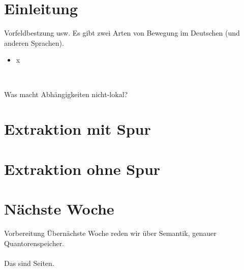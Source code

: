 \section{Einleitung}

\begin{frame}
  {Vorfeldbestzung usw.}
  \onslide<+->
  \onslide<+->
  Es gibt zwei Arten von Bewegung im Deutschen (und anderen Sprachen).\\
  \Zeile
  \begin{itemize}[<+->]
    \item x
  \end{itemize}
  \Zeile
  \onslide<+->
  \centering 
  \\
\end{frame}

\begin{frame}
  {Was macht Abhängigkeiten nicht-lokal?}
\end{frame}

\section{Extraktion mit Spur}

\section{Extraktion ohne Spur}

\section{Nächste Woche}

\begin{frame}
  {Vorbereitung}
  \onslide<+->
  \onslide<+->
  \centering 
  \large
  \alert{Übernächste} Woche reden wir über Semantik, genauer Quantorenspeicher.\\
  \onslide<+->
  \Zeile
  \\
  \onslide<+->
  \Viertelzeile
  Das sind  Seiten.\\
\end{frame}
